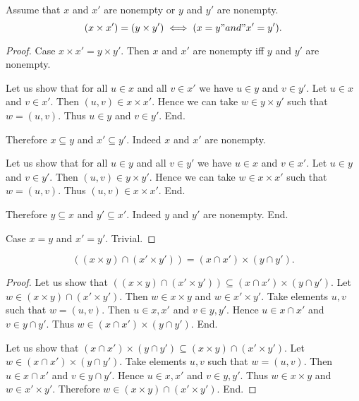 \documentclass[../../sets-and-functions.ftl.tex]{subfiles}
\begin{document}
\begin{forthel}
    \begin{proposition}[SF 01 05 472623]
      Assume that $x$ and $x'$ are nonempty or $y$ and $y'$ are nonempty.
      $$(x \times x') = (y \times y') \iff (x = y "and" x' = y').$$
    \end{proposition}
    \begin{proof}
      Case $x \times x' = y \times y'$.
        Then $x$ and $x'$ are nonempty iff $y$ and $y'$ are nonempty.

        Let us show that for all $u \in x$ and all $v \in x'$ we have $u \in y$ and $v \in y'$.
          Let $u \in x$ and $v \in x'$.
          Then $(u,v) \in x \times x'$.
          Hence we can take $w \in y \times y'$ such that $w = (u,v)$.
          Thus $u \in y$ and $v \in y'$.
        End.

        Therefore $x \subseteq y$ and $x' \subseteq y'$.
        Indeed $x$ and $x'$ are nonempty.

        Let us show that for all $u \in y$ and all $v \in y'$ we have $u \in x$ and $v \in x'$.
          Let $u \in y$ and $v \in y'$.
          Then $(u,v) \in y \times y'$.
          Hence we can take $w \in x \times x'$ such that $w = (u,v)$.
          Thus $(u,v) \in x \times x'$.
        End.

        Therefore $y \subseteq x$ and $y' \subseteq x'$.
        Indeed $y$ and $y'$ are nonempty.
      End.

      Case $x = y$ and $x' = y'$. Trivial.
    \end{proof}

    \begin{proposition}[SF 01 05 261950]
      $$((x \times y) \cap (x' \times y')) = (x \cap x') \times (y \cap y').$$
    \end{proposition}
    \begin{proof}
      Let us show that $((x \times y) \cap (x' \times y')) \subseteq (x \cap x') \times (y \cap y')$.
        Let $w \in (x \times y) \cap (x' \times y')$.
        Then $w \in x \times y$ and $w \in x' \times y'$.
        Take elements $u,v$ such that $w = (u,v)$.
        Then $u \in x,x'$ and $v \in y,y'$.
        Hence $u \in x \cap x'$ and $v \in y \cap y'$.
        Thus $w \in (x \cap x') \times (y \cap y')$.
      End.

      Let us show that $(x \cap x') \times (y \cap y') \subseteq (x \times y) \cap (x' \times y')$.
        Let $w \in (x \cap x') \times (y \cap y')$.
        Take elements $u,v$ such that $w = (u,v)$.
        Then $u \in x \cap x'$ and $v \in y \cap y'$.
        Hence $u \in x,x'$ and $v \in y,y'$.
        Thus $w \in x \times y$ and $w \in x' \times y'$.
        Therefore $w \in (x \times y) \cap (x' \times y')$.
      End.
    \end{proof}


\end{forthel}
\end{document}
